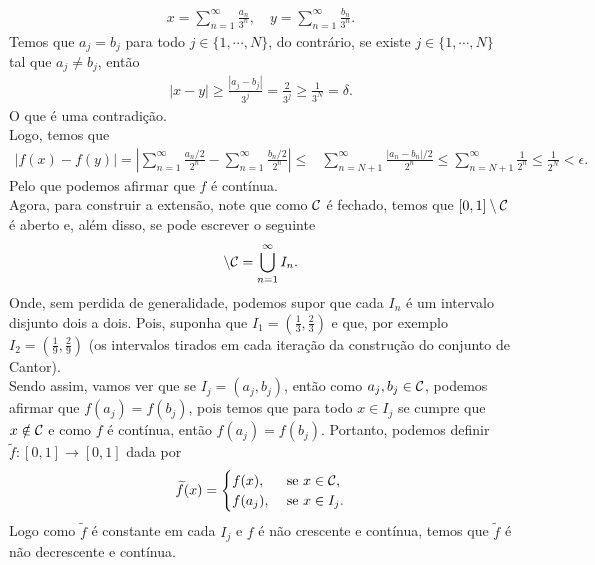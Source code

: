 \begin{homeworkProblem}[3]
\begin{solution}
\begin{enumerate}[a)]
      \begin{align*}
        x=\sum_{n=1}^{\infty}\frac{a_n}{3^{n}},\quad y=\sum_{n=1}^{\infty}\frac{b_n}{3^n}.
      \end{align*}
      Temos que $a_j=b_j$ para todo $j\in\{1,\cdots, N\}$, do contrário, se existe $j\in\{1,\cdots, N\}$ tal que $a_j\neq b_j$, então
      \begin{align*}
        |x-y|\geq \frac{|a_j-b_j|}{3^j}=\frac{2}{3^{j}}\geq\frac{1}{3^N}=\delta.
      \end{align*}
      O que é uma contradição.\\
      Logo, temos que
      \begin{align*}
        |f(x)-f(y)|=\left| \sum_{n=1}^{\infty}\frac{a_n/2}{2^n}-\sum_{n=1}^{\infty}\frac{b_n/2}{2^n} \right|\leq&\sum_{n=N+1}^{\infty}\frac{|a_n-b_n|/2}{2^n}\leq \sum_{n=N+1}^{\infty}\frac{1}{2^n}\leq \frac{1}{2^N}<\epsilon.
      \end{align*}
      Pelo que podemos afirmar que $f$ é contínua.\\
      Agora, para construir a extensão, note que como $\mathcal{C}$ é fechado, temos que $[0,1]\setminus \mathcal{C}$ é aberto e, além disso, se pode escrever o seguinte
      \begin{align*}
        [0,1]\setminus \cali{C}=\bigcup_{n=1}^{\infty}I_n.       
      \end{align*}
      Onde, sem perdida de generalidade, podemos supor que cada $I_n$ é um intervalo disjunto dois a dois. Pois, suponha que $I_1=\left( \frac{1}{3},\frac{2}{3} \right)$ e que, por exemplo $I_2=\left( \frac{1}{9},\frac{2}{9} \right)$ (os intervalos tirados em cada iteração da construção do conjunto de Cantor).\\
      Sendo assim, vamos ver que se $I_j=(a_j,b_j)$, então como $a_j,b_j\in\mathcal{C}$, podemos afirmar que $f(a_j)=f(b_j)$, pois temos que para todo $x\in I_j$ se cumpre que $x\notin\mathcal{C}$ e como $f$ é contínua, então $f(a_j)=f(b_j)$. Portanto, podemos definir $\tilde{f}:[0,1]\to[0,1]$ dada por
      \begin{align*}
        \widetilde{f}(x)=\begin{cases}
          f(x), &\text{ se } x\in\mathcal{C} \text{,} \\
          f(a_j), &\text{ se } x\in I_j.
        \end{cases}
      \end{align*}
      Logo como $\tilde{f}$ é constante em cada $I_j$ e $f$ é não crescente e contínua, temos que $\tilde{f}$ é não decrescente e contínua. 
  \end{enumerate} 
  \end{solution}
\end{homeworkProblem}
